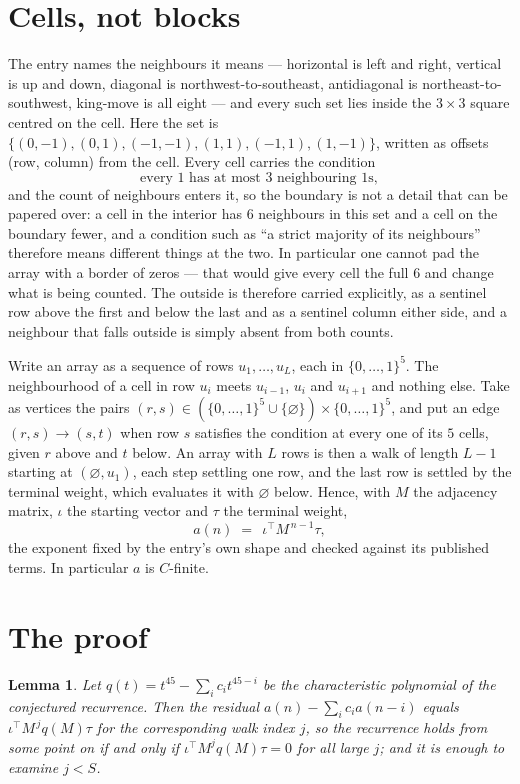 \documentclass[11pt,a4paper]{article}
\theoremstyle{plain}
\newtheorem{lemma}[theorem]{Lemma}
\theoremstyle{definition}
\begin{document}
\section{Cells, not blocks}

The entry names the neighbours it means --- horizontal is left and right, vertical is up and
down, diagonal is northwest-to-southeast, antidiagonal is northeast-to-southwest, king-move is
all eight --- and every such set lies inside the $3\times3$ square centred on the cell. Here
the set is $\{(0,-1), (0,1), (-1,-1), (1,1), (-1,1), (1,-1)\}$, written as offsets (row, column) from the cell. Every cell carries
the condition
\[
\text{every 1 has at most 3 neighbouring 1s},
\]
and the count of neighbours enters it, so the boundary is not a detail that can be papered
over: a cell in the interior has $6$ neighbours in this set and a cell on the boundary
fewer, and a condition such as ``a strict majority of its neighbours'' therefore means
different things at the two. In particular one cannot pad the array with a border of zeros ---
that would give every cell the full $6$ and change what is being counted. The outside is
therefore carried
explicitly, as a sentinel row above the first and below the last and as a sentinel column
either side, and a neighbour that falls outside is simply absent from both counts.

Write an array as a sequence of rows $u_1,\dots,u_L$, each in
$\{0,\dots,1\}^{5}$. The neighbourhood of a cell in row $u_i$ meets $u_{i-1}$,
$u_i$ and $u_{i+1}$ and nothing else. Take as vertices the pairs
$(r,s)\in(\{0,\dots,1\}^{5}\cup\{\varnothing\})\times\{0,\dots,1\}^{5}$,
and put an edge $(r,s)\to(s,t)$ when row $s$ satisfies the condition at every one of its
$5$ cells, given $r$ above and $t$ below. An array with $L$ rows is then a walk of length
$L-1$ starting at $(\varnothing,u_1)$, each step settling one row, and the last row is
settled by the terminal weight, which evaluates it with $\varnothing$ below. Hence,
with $M$ the adjacency matrix, $\iota$ the starting vector and $\tau$ the terminal weight,
\[
a(n)\;=\;\,\iota^{\!\top}M^{\,n-1}\tau ,
\]
the exponent fixed by the entry's own shape and checked against its published terms. In
particular $a$ is $C$-finite.

\section{The proof}

\begin{lemma}\label{lem:crit}
Let $q(t)=t^{45}-\sum_i c_it^{45-i}$ be the characteristic polynomial of the
conjectured recurrence. Then the residual $a(n)-\sum_ic_ia(n-i)$ equals
$\iota^{\!\top}M^{\,j}q(M)\tau$ for the corresponding walk index $j$, so the
recurrence holds from some point on if and only if $\iota^{\!\top}M^{j}q(M)\tau=0$ for all
large $j$; and it is enough to examine $j<S$.
\end{lemma}
\end{document}
